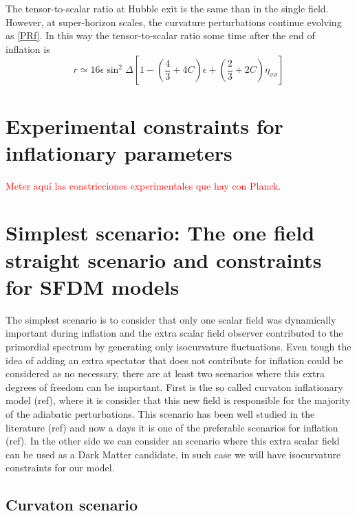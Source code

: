 \documentclass[a4paper,fleqn,usenatbib,useAMS]{mnras}
\begin{document}
The tensor-to-scalar ratio at Hubble exit is the same than in the single field. However, at super-horizon scales, the curvature perturbations continue evolving as \eqref{PRf}. In this way the tensor-to-scalar ratio some time after the end of inflation is
\begin{equation}
r\simeq 16\epsilon \sin^2\Delta\left[1-\left(\frac{4}{3}+4C\right)\epsilon +\left(\frac{2}{3}+2C\right)\eta_{\sigma\sigma}\right]
\end{equation}
\section{Experimental constraints for inflationary parameters}

\textcolor{red}{Meter aqu\'i las constricciones experimentales que hay con Planck.}

%
%
%
%
%
%
\section{Simplest scenario: The one field straight scenario and constraints for SFDM models}

The simplest scenario is to consider that only one scalar field was dynamically important during inflation and the extra scalar field observer contributed to the primordial spectrum by generating only isocurvature fluctuations. Even tough the idea of adding an extra spectator that does not contribute for inflation could be considered as no necessary, there are at least two scenarios where this extra degrees of freedom can be important. First is the so called curvaton inflationary model (ref), where it is consider that this new field is responsible for the majority of the adiabatic perturbations. This scenario has been well studied in the literature (ref) and now a days it is one of the preferable scenarios for inflation (ref). In the other side we can consider an scenario where this extra scalar field can be used as a Dark Matter candidate, in such case we will have isocurvature constraints for our model. 

\subsection{Curvaton scenario}
\end{document}
